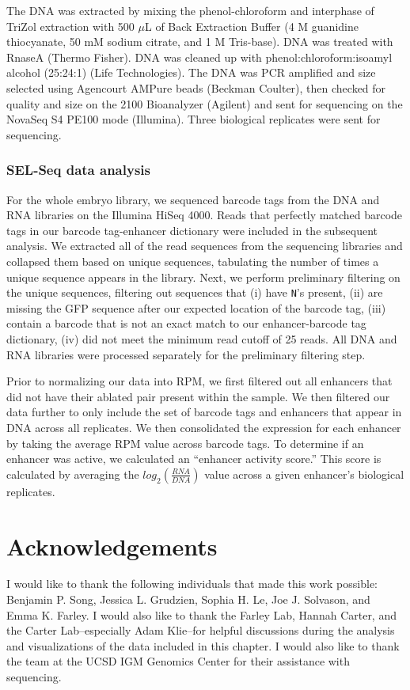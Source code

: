 The DNA was extracted by mixing the phenol-chloroform and interphase of TriZol extraction with 500 $\mu$L of Back Extraction Buffer (4 M guanidine thiocyanate, 50 mM sodium citrate, and 1 M Tris-base). DNA was treated with RnaseA (Thermo Fisher). DNA was cleaned up with phenol:chloroform:isoamyl alcohol (25:24:1) (Life Technologies). The DNA was PCR amplified and size selected using Agencourt AMPure beads (Beckman Coulter), then checked for quality and size on the 2100 Bioanalyzer (Agilent) and sent for sequencing on the NovaSeq S4 PE100 mode (Illumina). Three biological replicates were sent for sequencing.

\subsubsection{SEL-Seq data analysis}
For the whole embryo library, we sequenced barcode tags from the DNA and RNA libraries on the Illumina HiSeq 4000. Reads that perfectly matched barcode tags in our barcode tag-enhancer dictionary were included in the subsequent analysis. We extracted all of the read sequences from the sequencing libraries and collapsed them based on unique sequences, tabulating the number of times a unique sequence appears in the library. Next, we perform preliminary filtering on the unique sequences, filtering out sequences that (i) have \verb|N|’s present, (ii) are missing the GFP sequence after our expected location of the barcode tag, (iii) contain a barcode that is not an exact match to our enhancer-barcode tag dictionary, (iv) did not meet the minimum read cutoff of 25 reads. All DNA and RNA libraries were processed separately for the preliminary filtering step. 

Prior to normalizing our data into RPM, we first filtered out all enhancers that did not have their ablated pair present within the sample. We then filtered our data further to only include the set of barcode tags and enhancers that appear in DNA across all replicates. We then consolidated the expression for each enhancer by taking the average RPM value across barcode tags. To determine if an enhancer was active, we calculated an “enhancer activity score.” This score is calculated by averaging the $log_2({\frac{RNA}{DNA}})$ value across a given enhancer’s biological replicates. 

\section{Acknowledgements}
I would like to thank the following individuals that made this work possible: Benjamin P. Song, Jessica L. Grudzien, Sophia H. Le, Joe J. Solvason, and Emma K. Farley. I would also like to thank the Farley Lab, Hannah Carter, and the Carter Lab--especially Adam Klie--for helpful discussions during the analysis and visualizations of the data included in this chapter. I would also like to thank the team at the UCSD IGM Genomics Center for their assistance with sequencing. 

